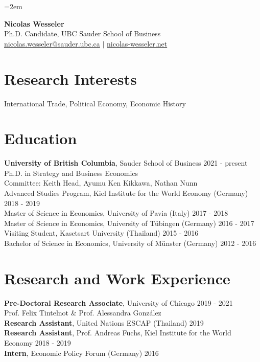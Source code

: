 \documentclass[11pt]{article}
\begin{document}
\pagestyle{empty}

\leftskip=2em

\begin{center}
    {\LARGE \textbf{Nicolas Wesseler}} \\
    Ph.D. Candidate, UBC Sauder School of Business \\
    \href{mailto:nicolas.wesseler@sauder.ubc.ca}{nicolas.wesseler@sauder.ubc.ca}
    \quad $\vert$ \quad
    \href{https://nicolas-wesseler.net}{nicolas-wesseler.net}
\end{center}

\section*{Research Interests}
International Trade, Political Economy, Economic History

\section*{Education}
\textbf{University of British Columbia}, Sauder School of Business  \hfill 2021 - present \\
Ph.D. in Strategy and Business Economics \\
Committee: Keith Head, Ayumu Ken Kikkawa, Nathan Nunn \\

\noindent
Advanced Studies Program, Kiel Institute for the World Economy (Germany) \hfill 2018 - 2019 \\
Master of Science in Economics, University of Pavia (Italy) \hfill 2017 - 2018 \\
Master of Science in Economics, University of Tübingen (Germany) \hfill 2016 - 2017 \\
Visiting Student, Kasetsart University (Thailand)  \hfill 2015 - 2016 \\
Bachelor of Science in Economics, University of Münster (Germany) \hfill 2012 - 2016 

\section*{Research and Work Experience}
\textbf{Pre-Doctoral Research Associate}, University of Chicago \hfill 2019 - 2021 \\
Prof. Felix Tintelnot \& Prof. Alessandra Gonz\'{a}lez \\
\textbf{Research Assistant}, United Nations ESCAP (Thailand) \hfill 2019  \\
\textbf{Research Assistant}, Prof. Andreas Fuchs, Kiel Institute for the World Economy \hfill 2018 - 2019 \\
\textbf{Intern}, Economic Policy Forum (Germany) \hfill 2016 
\end{document}

